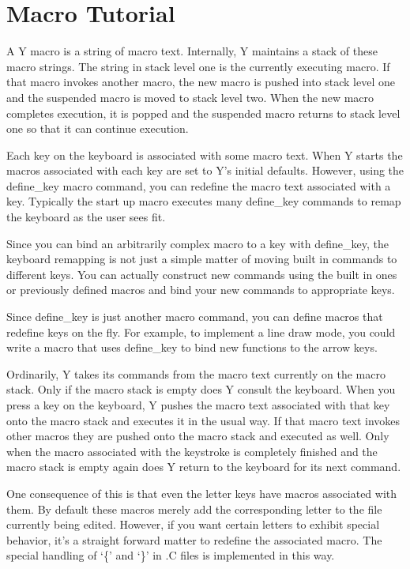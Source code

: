 \chapter{Macro Tutorial}

A Y macro is a string of macro text. Internally, Y maintains a stack of these macro strings. The
string in stack level one is the currently executing macro. If that macro invokes another macro,
the new macro is pushed into stack level one and the suspended macro is moved to stack level
two. When the new macro completes execution, it is popped and the suspended macro returns to
stack level one so that it can continue execution.

Each key on the keyboard is associated with some macro text. When Y starts the macros associated
with each key are set to Y's initial defaults. However, using the define\_key macro command, you
can redefine the macro text associated with a key. Typically the start up macro executes many
define\_key commands to remap the keyboard as the user sees fit.

Since you can bind an arbitrarily complex macro to a key with define\_key, the keyboard
remapping is not just a simple matter of moving built in commands to different keys. You can
actually construct new commands using the built in ones or previously defined macros and bind
your new commands to appropriate keys.

Since define\_key is just another macro command, you can define macros that redefine keys on the
fly. For example, to implement a line draw mode, you could write a macro that uses define\_key
to bind new functions to the arrow keys.

Ordinarily, Y takes its commands from the macro text currently on the macro stack. Only if the
macro stack is empty does Y consult the keyboard. When you press a key on the keyboard, Y pushes
the macro text associated with that key onto the macro stack and executes it in the usual way.
If that macro text invokes other macros they are pushed onto the macro stack and executed as
well. Only when the macro associated with the keystroke is completely finished and the macro
stack is empty again does Y return to the keyboard for its next command.

One consequence of this is that even the letter keys have macros associated with them. By
default these macros merely add the corresponding letter to the file currently being edited.
However, if you want certain letters to exhibit special behavior, it's a straight forward matter
to redefine the associated macro. The special handling of `\{' and `\}' in .C files is
implemented in this way.

